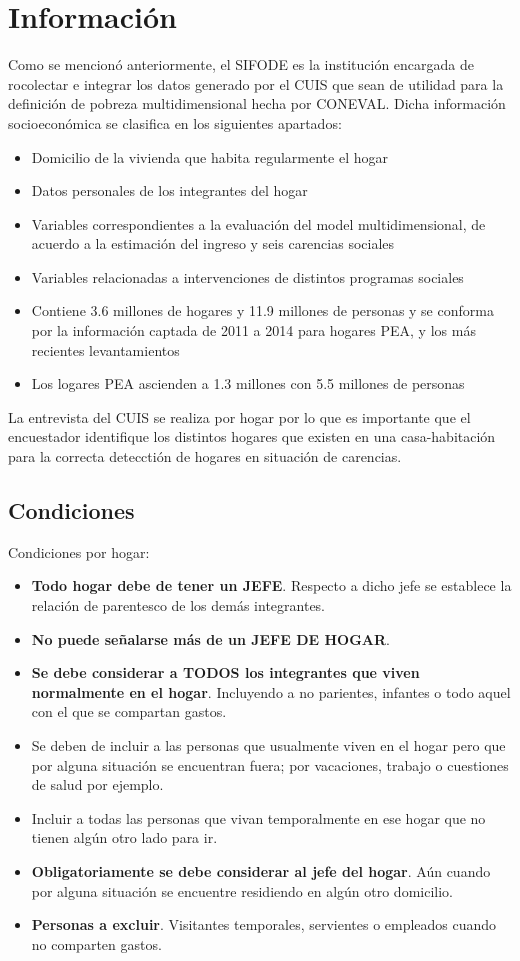 \section{Información}
Como se mencionó anteriormente, el SIFODE es la institución encargada de rocolectar e integrar los datos generado por el CUIS que sean de utilidad para la definición de pobreza multidimensional hecha por CONEVAL. Dicha información socioeconómica se clasifica en los siguientes apartados:
\begin{itemize}
    \item Domicilio de la vivienda que habita regularmente el hogar
    \item Datos personales de los integrantes del hogar
    \item Variables correspondientes a la evaluación del model multidimensional, de acuerdo a la estimación del ingreso y seis carencias sociales
    \item Variables relacionadas a intervenciones de distintos programas sociales
    \item Contiene 3.6 millones de hogares y 11.9 millones de personas y se conforma por la información captada de 2011 a 2014 para hogares PEA, y los más recientes levantamientos
    \item Los logares PEA ascienden a 1.3 millones con 5.5 millones de personas
\end{itemize}

La entrevista del CUIS se realiza por hogar por lo que es importante que el encuestador identifique los distintos hogares que existen en una casa-habitación para la correcta detecctión de hogares en situación de carencias.\\

\subsection{Condiciones}
Condiciones por hogar:
\begin{itemize}
    \item \textbf{Todo hogar debe de tener un JEFE}. Respecto a dicho jefe se establece la relación de parentesco de los demás integrantes.
    \item \textbf{No puede señalarse más de un JEFE DE HOGAR}.
    \item \textbf{Se debe considerar a TODOS los integrantes que viven normalmente en el hogar}. Incluyendo a no parientes, infantes o todo aquel con el que se compartan gastos.
    \item Se deben de incluir a las personas que usualmente viven en el hogar pero que por alguna situación se encuentran fuera; por vacaciones, trabajo o cuestiones de salud por ejemplo.
    \item Incluir a todas las personas que vivan temporalmente en ese hogar que no tienen algún otro lado para ir.
    \item  \textbf{Obligatoriamente se debe considerar al jefe del hogar}. Aún cuando por alguna situación se encuentre residiendo en algún otro domicilio.
    \item \textbf{Personas a excluir}. Visitantes temporales, servientes o empleados cuando no comparten gastos.
\end{itemize}
